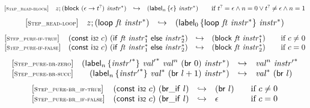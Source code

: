 \documentclass{article}
\begin{document}
$$
\begin{array}{@{}l@{}rcl@{}l@{}}
{[\textsc{\scriptsize Step\_read{-}block}]} \quad & z ; (\mathsf{block}~(\epsilon \rightarrow {t^?})~{{\mathit{instr}}^\ast}) &\hookrightarrow& ({\mathsf{label}}_{n}\,\{ \epsilon \}~{{\mathit{instr}}^\ast})
  &\qquad \mbox{if}~{t^?} = \epsilon \land n = 0 \lor {t^?} \neq \epsilon \land n = 1 \\
\end{array}
$$
$$
\begin{array}{@{}l@{}rcl@{}l@{}}
{[\textsc{\scriptsize Step\_read{-}loop}]} \quad & z ; (\mathsf{loop}~{\mathit{ft}}~{{\mathit{instr}}^\ast}) &\hookrightarrow& ({\mathsf{label}}_{0}\,\{ \mathsf{loop}~{\mathit{ft}}~{{\mathit{instr}}^\ast} \}~{{\mathit{instr}}^\ast}) \\
\end{array}
$$
$$
\begin{array}{@{}l@{}rcl@{}l@{}}
{[\textsc{\scriptsize Step\_pure{-}if{-}true}]} \quad & (\mathsf{const}~\mathsf{i{\scriptstyle 32}}~c)~(\mathsf{if}~{\mathit{ft}}~{{\mathit{instr}}_1^\ast}~\mathsf{else}~{{\mathit{instr}}_2^\ast}) &\hookrightarrow& (\mathsf{block}~{\mathit{ft}}~{{\mathit{instr}}_1^\ast})
  &\qquad \mbox{if}~c \neq 0 \\
{[\textsc{\scriptsize Step\_pure{-}if{-}false}]} \quad & (\mathsf{const}~\mathsf{i{\scriptstyle 32}}~c)~(\mathsf{if}~{\mathit{ft}}~{{\mathit{instr}}_1^\ast}~\mathsf{else}~{{\mathit{instr}}_2^\ast}) &\hookrightarrow& (\mathsf{block}~{\mathit{ft}}~{{\mathit{instr}}_2^\ast})
  &\qquad \mbox{if}~c = 0 \\
\end{array}
$$
$$
\begin{array}{@{}l@{}rcl@{}l@{}}
{[\textsc{\scriptsize Step\_pure{-}br{-}zero}]} \quad & ({\mathsf{label}}_{n}\,\{ {{\mathit{instr}'}^\ast} \}~{{\mathit{val}'}^\ast}~{{\mathit{val}}^{n}}~(\mathsf{br}~0)~{{\mathit{instr}}^\ast}) &\hookrightarrow& {{\mathit{val}}^{n}}~{{\mathit{instr}'}^\ast} \\
{[\textsc{\scriptsize Step\_pure{-}br{-}succ}]} \quad & ({\mathsf{label}}_{n}\,\{ {{\mathit{instr}'}^\ast} \}~{{\mathit{val}}^\ast}~(\mathsf{br}~l + 1)~{{\mathit{instr}}^\ast}) &\hookrightarrow& {{\mathit{val}}^\ast}~(\mathsf{br}~l) \\
\end{array}
$$
$$
\begin{array}{@{}l@{}rcl@{}l@{}}
{[\textsc{\scriptsize Step\_pure{-}br\_if{-}true}]} \quad & (\mathsf{const}~\mathsf{i{\scriptstyle 32}}~c)~(\mathsf{br\_if}~l) &\hookrightarrow& (\mathsf{br}~l)
  &\qquad \mbox{if}~c \neq 0 \\
{[\textsc{\scriptsize Step\_pure{-}br\_if{-}false}]} \quad & (\mathsf{const}~\mathsf{i{\scriptstyle 32}}~c)~(\mathsf{br\_if}~l) &\hookrightarrow& \epsilon
  &\qquad \mbox{if}~c = 0 \\
\end{array}
$$
\end{document}
